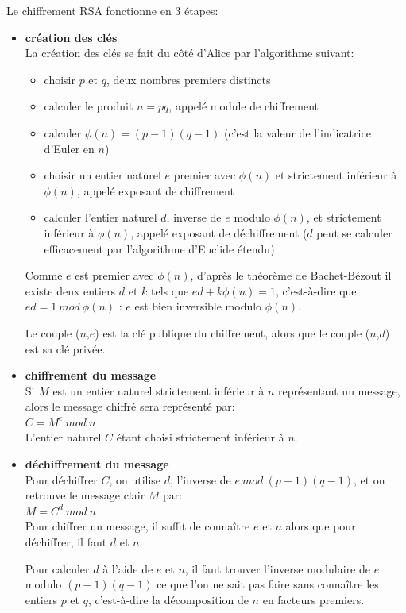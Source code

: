 Le chiffrement RSA fonctionne en 3 étapes:
\begin{itemize}
\item \textbf{création des clés} \\
La création des clés se fait du c\^oté d'Alice par l'algorithme suivant:
\begin{itemize}
\item choisir $p$ et $q$, deux nombres premiers distincts
\item calculer le produit $n = pq$, appelé module de chiffrement 
\item calculer $\phi(n) = (p - 1)(q -1)$ (c'est la valeur de l'indicatrice d'Euler en $n$) 
\item choisir un entier naturel $e$ premier avec $\phi(n)$ et strictement inférieur à  $\phi(n)$, appelé exposant de chiffrement
\item calculer l'entier naturel $d$, inverse de $e$ modulo  $\phi(n)$, et strictement inférieur à  $\phi(n)$, appelé exposant de déchiffrement ($d$ peut se calculer efficacement par l'algorithme d'Euclide étendu)
\end{itemize}
Comme $e$ est premier avec  $\phi(n)$, d'après le théorème de Bachet-Bézout il existe deux entiers $d$ et $k$ tels que $ed + k \phi(n) = 1$, c'est-à-dire que $ed = 1\ mod\ \phi(n)$ : $e$ est bien inversible modulo $\phi(n)$.

Le couple ($n$,$e$) est la clé publique du chiffrement, alors que le couple ($n$,$d$) est sa clé privée.

\item \textbf{chiffrement du message} \\
Si $M$ est un entier naturel strictement inférieur à $n$ représentant un message, alors le message chiffré sera représenté par: \\
$C = M^e\ mod\ n$ \\
L'entier naturel $C$ étant choisi strictement inférieur à $n$.

\item \textbf{déchiffrement du message} \\
Pour déchiffrer $C$, on utilise $d$, l'inverse de $e\ mod\ (p-1)(q-1)$, et on retrouve le message clair $M$ par: \\
$M = C^d\ mod\ n$ \\


Pour chiffrer un message, il suffit de connaître $e$ et $n$ alors que pour déchiffrer, il faut $d$ et $n$. 

Pour calculer $d$ à l'aide de $e$ et $n$, il faut trouver l'inverse modulaire de $e$ modulo $(p - 1)(q - 1)$ ce que l'on ne sait pas faire sans connaître les entiers $p$ et $q$, c'est-à-dire la décomposition de $n$ en facteurs premiers. 


\end{itemize}

